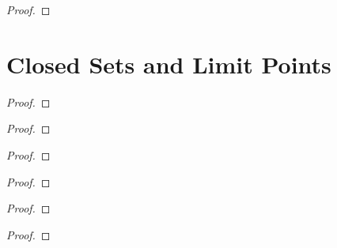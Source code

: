 \begin{proof}
\end{proof}

\section{Closed Sets and Limit Points}

\begin{exercise}\label{chapter2:section17:exercise1}
\end{exercise}

\begin{proof}
\end{proof}

\begin{exercise}\label{chapter2:section17:exercise2}
\end{exercise}

\begin{proof}
\end{proof}

\begin{exercise}\label{chapter2:section17:exercise3}
\end{exercise}

\begin{proof}
\end{proof}

\begin{exercise}\label{chapter2:section17:exercise4}
\end{exercise}

\begin{proof}
\end{proof}

\begin{exercise}\label{chapter2:section17:exercise5}
\end{exercise}

\begin{proof}
\end{proof}

\begin{exercise}\label{chapter2:section17:exercise6}
\end{exercise}

\begin{proof}
\end{proof}

\begin{exercise}\label{chapter2:section17:exercise7}
\end{exercise}

